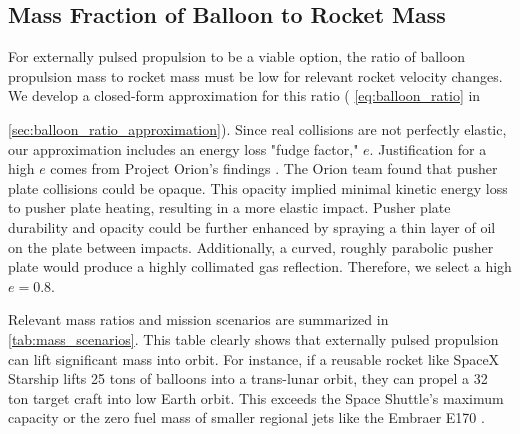 \documentclass{article}
\begin{document}
\subsection{Mass Fraction of Balloon to Rocket Mass}
For externally pulsed propulsion to be a viable option, the ratio of balloon propulsion mass to rocket mass must be low for relevant rocket velocity changes. We develop a closed-form approximation for this ratio ( \autoref{eq:balloon_ratio} in {\autoref{sec:balloon_ratio_approximation}). Since real collisions are not perfectly elastic, our approximation includes an energy loss "fudge factor," \(e\).  Justification for a high \(e\) comes from Project Orion's findings \cite{orion_reflections}.   The Orion team found that pusher plate collisions could be opaque. This opacity implied minimal kinetic energy loss to pusher plate heating, resulting in a more elastic impact. Pusher plate durability and opacity could be further enhanced by spraying a thin layer of oil on the plate between impacts.   Additionally, a curved, roughly parabolic pusher plate would produce a  highly collimated gas reflection. Therefore, we select a high  \(e=0.8\).   

Relevant mass ratios and mission scenarios are summarized in \autoref{tab:mass_scenarios}. This table clearly shows that externally pulsed propulsion can lift significant mass into orbit. For instance, if a reusable rocket like SpaceX Starship \cite{starship} lifts 25 tons of balloons into a trans-lunar orbit, they can propel a 32 ton target craft into low Earth orbit. This exceeds the Space Shuttle's maximum capacity \cite{space_shuttle_program} or the zero fuel mass of smaller regional jets like the Embraer E170 \cite{embraer_e170}.

}
\end{document}
